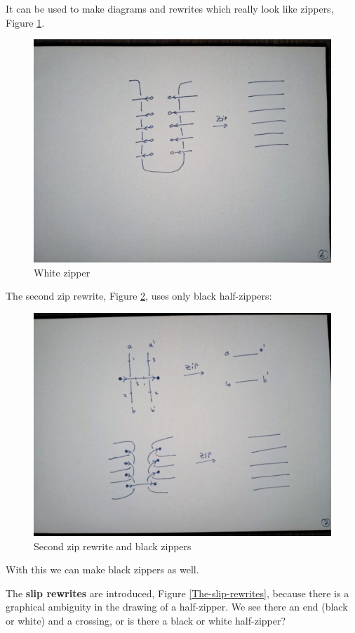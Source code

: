 \documentclass[]{article}
\begin{document}
It can be used to make diagrams and rewrites which really look like
zippers, Figure \ref{White-zipper}.

\begin{figure}[h!]
\centering
\includegraphics[width=0.75\linewidth]{img/3807.jpg}
\caption{White zipper}
\label{White-zipper}
\end{figure}

The second zip rewrite, Figure \ref{Second-zip-rewrite-and-black-zippers}, uses only black half-zippers:

\begin{figure}[h!]
\centering
\includegraphics[width=0.75\linewidth]{img/3821.jpg}
\caption{Second zip rewrite and black zippers}
\label{Second-zip-rewrite-and-black-zippers}
\end{figure}

With this we can make black zippers as well.

The \textbf{slip rewrites} are introduced, Figure  \ref{The-slip-rewrites}, because there is a graphical
ambiguity in the drawing of a half-zipper. We see there an end (black or
white) and a crossing, or is there a black or white half-zipper?
\end{document}
